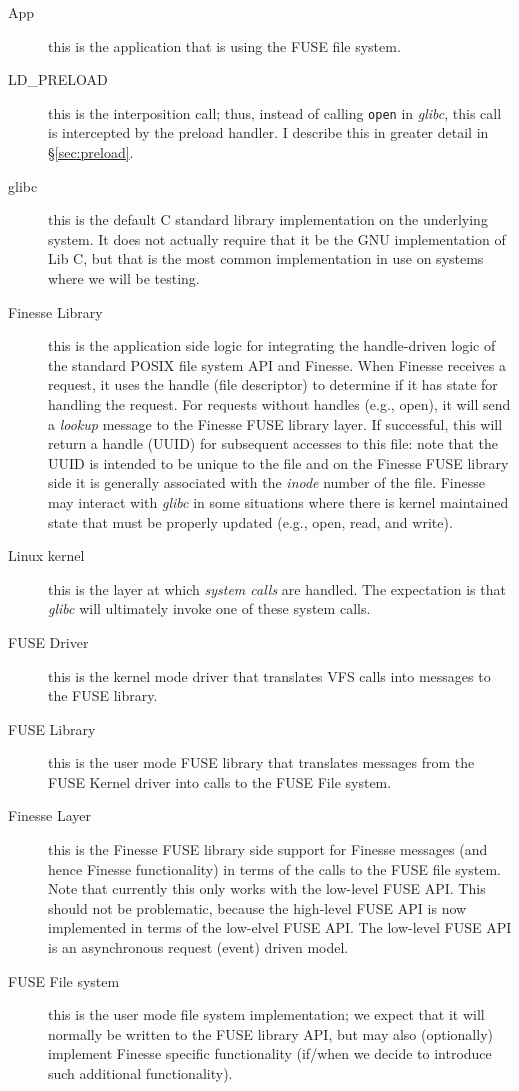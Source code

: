 \documentclass[a4paper,11pt]{article}
\begin{document}
\begin{description}
    \item[App] this is the application that is using the FUSE file system.
    \item[LD\_PRELOAD]  this is the interposition call; thus, instead of calling \texttt{open} in \textit{glibc}, this call is intercepted by the preload handler.  I describe this in greater detail in \S \ref{sec:preload}.
    \item[glibc]  this is the default C standard library implementation on the underlying system.  It does not actually require that it be the GNU implementation of Lib C, but that is the most common implementation in use on systems where we will be testing.
    \item[Finesse Library]  this is the application side logic for integrating the handle-driven logic of the standard POSIX file system API and Finesse.  When Finesse receives a request, it uses the handle (file descriptor) to determine if it has state for handling the request.  For requests without handles (e.g., open), it will send a \textit{lookup} message to the Finesse FUSE library layer.  If successful, this will return a handle (UUID) for subsequent accesses to this file: note that the UUID is intended to be unique to the file and on the Finesse FUSE library side it is generally associated with the \textit{inode} number of the file.  Finesse may interact with \textit{glibc} in some situations where there is kernel maintained state that must be properly updated (e.g., open, read, and write).
    \item[Linux kernel] this is the layer at which \textit{system calls} are handled.  The expectation is that \textit{glibc} will ultimately invoke one of these system calls.
    \item[FUSE Driver] this is the kernel mode driver that translates VFS calls into messages to the FUSE library.
    \item[FUSE Library] this is the user mode FUSE library that translates messages from the FUSE Kernel driver into calls to the FUSE File system.
    \item[Finesse Layer] this is the Finesse FUSE library side support for Finesse messages (and hence Finesse functionality) in terms of the calls to the FUSE file system. Note that currently this only works with the low-level FUSE API.  This should not be problematic, because the high-level FUSE API is now implemented in terms of the low-elvel FUSE API.  The low-level FUSE API is an asynchronous request (event) driven model.
    \item[FUSE File system] this is the user mode file system implementation; we expect that it will normally be written to the FUSE library API, but may also (optionally) implement Finesse specific functionality (if/when we decide to introduce such additional functionality).
\end{description}
\end{document}
